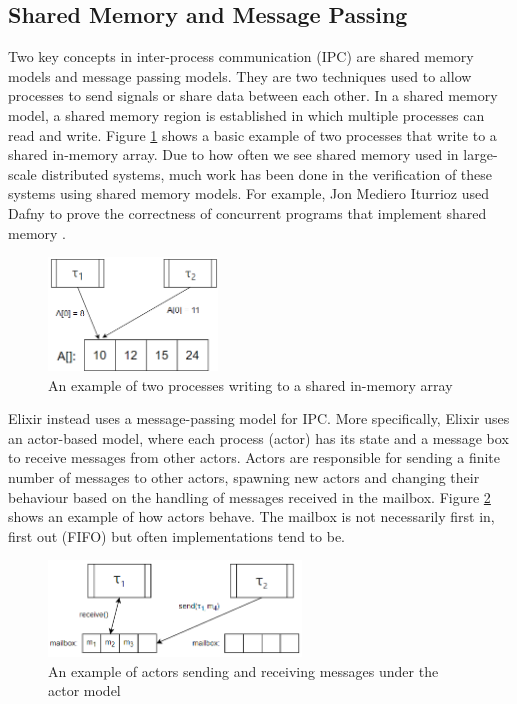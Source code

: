 \subsection{Shared Memory and Message Passing}
Two key concepts in inter-process communication (IPC) are shared memory models and message passing models. They are two techniques used to allow processes to send signals or share data between each other. In a shared memory model, a shared memory region is established in which multiple processes can read and write. Figure \ref{fig:shared_memory} shows a basic example of two processes that write to a shared in-memory array. Due to how often we see shared memory used in large-scale distributed systems, much work has been done in the verification of these systems using shared memory models. For example, Jon Mediero Iturrioz used Dafny \cite{dafny} to prove the correctness of concurrent programs that implement shared memory \cite{shared_memory_verification}. 
\begin{figure}[h]
    \centering
    \includegraphics[width=0.4\textwidth]{images/shared_memory.png}
    \caption{An example of two processes writing to a shared in-memory array}
    \label{fig:shared_memory}
\end{figure}
\par
Elixir instead uses a message-passing model for IPC. More specifically, Elixir uses an actor-based model, where each process (actor) has its state and a message box to receive messages from other actors. Actors are responsible for sending a finite number of messages to other actors, spawning new actors and changing their behaviour based on the handling of messages received in the mailbox. Figure \ref{fig:actor_model} shows an example of how actors behave. The mailbox is not necessarily first in, first out (FIFO) but often implementations tend to be.
\begin{figure}[H]
    \centering
    \includegraphics[width=0.6\textwidth]{images/actor_model.png}
    \caption{An example of actors sending and receiving messages under the actor model}
    \label{fig:actor_model}
\end{figure}

